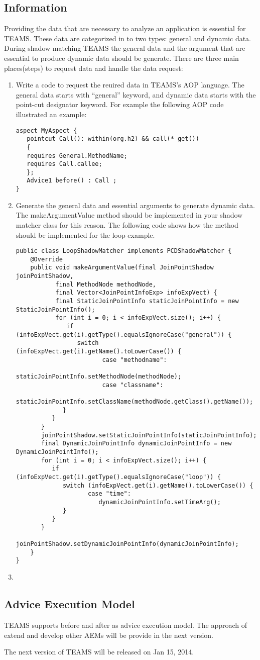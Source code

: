 \documentclass{report}
\begin{document}
\subsection{Information} 
Providing the data that are necessary to analyze an application is essential for T{\small{EAMS}}. These data are categorized in to two types: general and dynamic data. During shadow matching T{\small{EAMS}} the general data and the argument that are essential to produce dynamic data should be generate. There are three main places(steps) to request data and handle the data request:
\begin{enumerate}
\item Write a code to request the reuired data in T{\small{EAMS}}'s AOP language. The general data starts with ``general'' keyword, and dynamic data starts with the point-cut designator keyword. For example the following AOP code illustrated an example:
\begin{verbatim}
aspect MyAspect {
   pointcut Call(): within(org.h2) && call(* get())
   {
   requires General.MethodName;
   requires Call.callee; 
   };
   Advice1 before() : Call ;
}
\end{verbatim}
\item Generate the general data and essential arguments to generate dynamic data. The makeArgumentValue method should be implemented in your shadow matcher class for this reason. The following code shows how the method should be implemented for the loop example.
\begin{verbatim}
public class LoopShadowMatcher implements PCDShadowMatcher {
    @Override
    public void makeArgumentValue(final JoinPointShadow joinPointShadow,
    	   final MethodNode methodNode,
    	   final Vector<JoinPointInfoExp> infoExpVect) {
    	   final StaticJoinPointInfo staticJoinPointInfo = new StaticJoinPointInfo();
    	   for (int i = 0; i < infoExpVect.size(); i++) {
    	      if (infoExpVect.get(i).getType().equalsIgnoreCase("general")) {
    	         switch (infoExpVect.get(i).getName().toLowerCase()) {
    	            	case "methodname":
    	            	   staticJoinPointInfo.setMethodNode(methodNode);
    	            	case "classname":
    	            	  staticJoinPointInfo.setClassName(methodNode.getClass().getName());
 	         }
 	      }
 	   }
       joinPointShadow.setStaticJoinPointInfo(staticJoinPointInfo);
       final DynamicJoinPointInfo dynamicJoinPointInfo = new DynamicJoinPointInfo();
       for (int i = 0; i < infoExpVect.size(); i++) {
          if (infoExpVect.get(i).getType().equalsIgnoreCase("loop")) {
             switch (infoExpVect.get(i).getName().toLowerCase()) {
                	case "time":
                	   dynamicJoinPointInfo.setTimeArg();
             }
          }
       }
       joinPointShadow.setDynamicJoinPointInfo(dynamicJoinPointInfo);
	}
}
\end{verbatim}
\item 
\end{enumerate}


\subsection{Advice Execution Model}
T{\small EAMS} supports before and after as advice execution model. The approach of extend and develop other AEMs will be provide in the next version.



 The next version of T{\small EAMS} will be released on Jan 15, 2014. 
\end{document}
